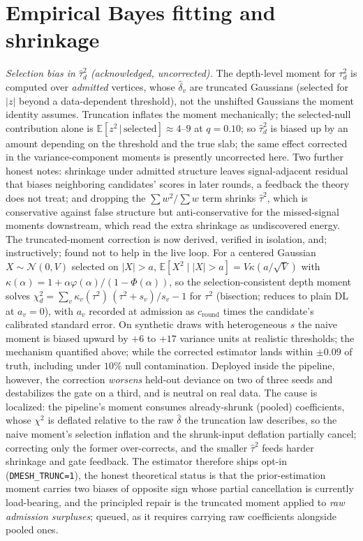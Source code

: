 \documentclass[11pt]{article}
\begin{document}
\section{Empirical Bayes fitting and shrinkage}\label{sec:eb}

\noindent\emph{Selection bias in $\hat\tau_d^2$ (acknowledged, uncorrected).}
The depth-level moment for $\tau_d^2$ is computed over \emph{admitted}
vertices, whose $\hat\delta_v$ are truncated Gaussians (selected for $|z|$
beyond a data-dependent threshold), not the unshifted Gaussians the moment
identity assumes. Truncation inflates the moment mechanically; the
selected-null contribution alone is $\mathbb{E}[z^2\,|\,\text{selected}]
\approx4$--$9$ at $q=0.10$; so $\hat\tau_d^2$ is biased up by an amount
depending on the threshold and the true slab; the same effect corrected in
the variance-component moments is presently uncorrected here. Two further
honest notes: shrinkage under admitted structure leaves signal-adjacent
residual that biases neighboring candidates' scores in later rounds, a
feedback the theory does not treat; and dropping the $\sum w^2/\sum w$ term
shrinks $\hat\tau^2$, which is conservative against false structure but
anti-conservative for the missed-signal moments downstream, which read the
extra shrinkage as undiscovered energy. The truncated-moment correction is now derived,
verified in isolation, and; instructively; found not to help in the
live loop. For a centered Gaussian $X\sim\mathcal N(0,V)$ selected on
$|X|>a$, $\mathbb E[X^2\mid|X|>a]=V\kappa(a/\sqrt V)$ with
$\kappa(\alpha)=1+\alpha\varphi(\alpha)/(1-\Phi(\alpha))$, so the
selection-consistent depth moment solves
$\chi^2_d=\sum_v\kappa_v(\tau^2)\,(\tau^2+s_v)/s_v-1$ for $\tau^2$
(bisection; reduces to plain DL at $a_v=0$), with $a_v$ recorded at
admission as $c_{\mathrm{round}}$ times the candidate's calibrated standard
error. On synthetic draws with heterogeneous $s$ the naive moment is biased
upward by $+6$ to $+17$ variance units at realistic thresholds; the
mechanism quantified above; while the corrected estimator lands within
$\pm0.09$ of truth, including under $10\%$ null contamination. Deployed
inside the pipeline, however, the correction \emph{worsens} held-out
deviance on two of three seeds and destabilizes the gate on a third, and is
neutral on real data. The cause is localized: the pipeline's moment consumes
already-shrunk (pooled) coefficients, whose $\chi^2$ is deflated relative to
the raw $\hat\delta$ the truncation law describes, so the naive moment's
selection inflation and the shrunk-input deflation partially cancel;
correcting only the former over-corrects, and the smaller $\hat\tau^2$
feeds harder shrinkage and gate feedback. The estimator therefore ships
opt-in (\texttt{DMESH\_TRUNC=1}), the honest theoretical status is that the
prior-estimation moment carries two biases of opposite sign whose partial
cancellation is currently load-bearing, and the principled repair is the
truncated moment applied to \emph{raw admission surpluses}; queued, as it
requires carrying raw coefficients alongside pooled ones.
\end{document}
